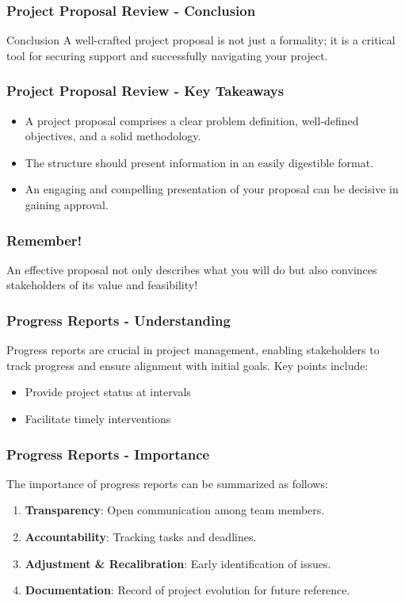 \documentclass[aspectratio=169]{beamer}
\begin{document}
\begin{frame}[fragile]
    \frametitle{Project Proposal Review - Conclusion}
    \begin{block}{Conclusion}
        A well-crafted project proposal is not just a formality; it is a critical tool for securing support and successfully navigating your project.
    \end{block}
\end{frame}

\begin{frame}[fragile]
    \frametitle{Project Proposal Review - Key Takeaways}
    \begin{itemize}
        \item A project proposal comprises a clear problem definition, well-defined objectives, and a solid methodology.
        \item The structure should present information in an easily digestible format.
        \item An engaging and compelling presentation of your proposal can be decisive in gaining approval.
    \end{itemize}
\end{frame}

\begin{frame}[fragile]
    \frametitle{Remember!}
    An effective proposal not only describes what you will do but also convinces stakeholders of its value and feasibility!
\end{frame}

\begin{frame}[fragile]
    \frametitle{Progress Reports - Understanding}
    Progress reports are crucial in project management, enabling stakeholders to track progress and ensure alignment with initial goals. Key points include:
    \begin{itemize}
        \item Provide project status at intervals
        \item Facilitate timely interventions
    \end{itemize}
\end{frame}

\begin{frame}[fragile]
    \frametitle{Progress Reports - Importance}
    The importance of progress reports can be summarized as follows:
    \begin{enumerate}
        \item \textbf{Transparency}: Open communication among team members.
        \item \textbf{Accountability}: Tracking tasks and deadlines.
        \item \textbf{Adjustment \& Recalibration}: Early identification of issues.
        \item \textbf{Documentation}: Record of project evolution for future reference.
    \end{enumerate}
\end{frame}
\end{document}
